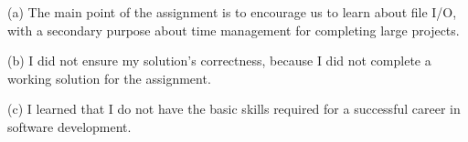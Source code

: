 \documentclass[letterpaper,10pt,titlepage]{article}
\begin{document}
(a) The main point of the assignment is to encourage us to learn about file I/O, with a secondary purpose about time management for completing large projects. 

(b) I did not ensure my solution's correctness, because I did not complete a working solution for the assignment. 

(c) I learned that I do not have the basic skills required for a successful career in software development. 


\end{document}

